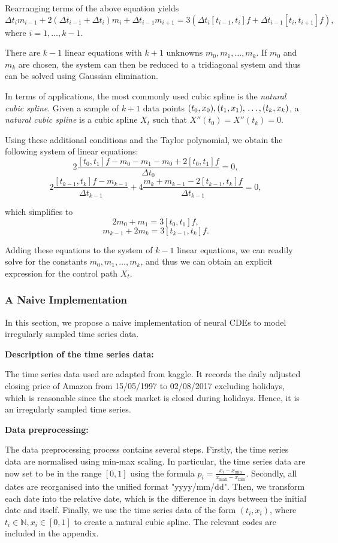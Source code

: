 \documentclass[a4paper,11pt,titlepage]{article}
\theoremstyle{definition}
\theoremstyle{plain}
\theoremstyle{remark}
\begin{document}
Rearranging terms of the above equation yields
$$\Delta t_im_{i-1}+2(\Delta t_{i-1}+\Delta t_i)m_i+\Delta t_{i-1}m_{i+1}=3(\Delta t_i[t_{i-1},t_i]f+\Delta t_{i-1}[t_i,t_{i+1}]f),$$
where $i=1,\dots,k-1$.

There are $k-1$ linear equations with $k+1$ unknowns $m_0,m_1,\dots,m_k$. If $m_0$ and $m_k$ are chosen, the system can then be reduced to a tridiagonal system and thus can be solved using Gaussian elimination.

In terms of applications, the most commonly used cubic spline is the \textit{natural cubic spline}.
 Given a sample of $k+1$ data points
$(t_0,x_0), (t_1,x_1), \\\dots, (t_k,x_k)$, a \textit{natural cubic spline} is a cubic spline $X_t$ such that $X''(t_0)=X''(t_k)=0$.

Using these additional conditions and the Taylor polynomial, we obtain the following system of linear equations:
$$2\frac{[t_0,t_1]f-m_0-m_1-m_0+2[t_0,t_1]f}{\Delta t_0}=0,$$
$$2\frac{[t_{k-1},t_k]f-m_{k-1}}{\Delta t_{k-1}}+4\frac{m_k+m_{k-1}-2[t_{k-1},t_k]f}{\Delta t_{k-1}}=0,$$

which simplifies to
$$2m_0+m_1=3[t_0,t_1]f,$$
$$m_{k-1}+2m_k=3[t_{k-1},t_k]f.$$

Adding these equations to the system of $k-1$ linear equations, we can readily solve for the constants $m_0,m_1,\dots,m_k$, and thus we can obtain an explicit expression for the control path $X_t$. 

\subsubsection{A Naive Implementation}

In this section, we propose a naive implementation of neural CDEs to model irregularly sampled time series data.

\textbf{Description of the time series data:}

The time series data used are adapted from kaggle. It records the daily adjusted closing price of Amazon from 15/05/1997 to 02/08/2017 excluding holidays, which is reasonable since the stock market is closed during holidays. Hence, it is an irregularly sampled time series.

\textbf{Data preprocessing:}

The data preprocessing process contains several steps. Firstly, the time series data are normalised using min-max scaling. In particular, the time series data are now set to be in the range $[0,1]$ using the formula $p_i=\frac{x_i-x_{\min}}{x_{\max}-x_{\min}}$. Secondly, all dates are reorganised into the unified format "yyyy/mm/dd". Then, we transform each date into the relative date, which is the difference in days between the initial date and itself. Finally, we use the time series data of the form $(t_i,x_i)$, where $t_i\in\mathbb{N}, x_i\in[0,1]$ to create a natural cubic spline. The relevant codes are included in the appendix.
\end{document}
